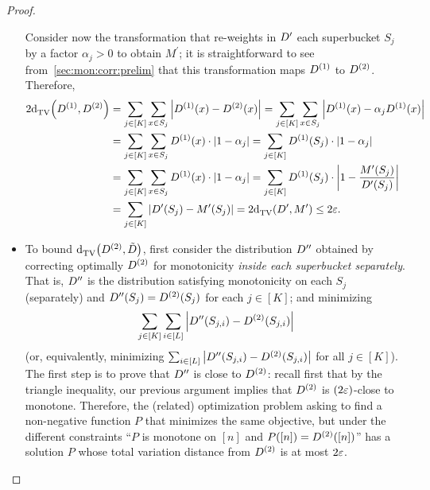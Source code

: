 \begin{proof}
\begin{itemize}
Consider now the transformation that re-weights in $D^\prime$ each superbucket $S_j$ by a factor $\alpha_j > 0$ to obtain $M^\prime$; it is straightforward to see from~\autoref{sec:mon:corr:prelim} that this transformation maps $D^{(1)}$ to $D^{(2)}$. Therefore,
\begin{align*}
2{\operatorname{d}_{\textrm{TV}}^{}\!\left({D^{(1)}, D^{(2)}}\right)} &= \sum_{j\in [K]} \sum_{x\in S_j} \left\lvert  D^{(1)}(x) - D^{(2)}(x)  \right\rvert = \sum_{j\in [K]} \sum_{x\in S_j} \left\lvert  D^{(1)}(x) - \alpha_jD^{(1)}(x)  \right\rvert \\
&= \sum_{j\in [K]} \sum_{x\in S_j}  D^{(1)}(x)\cdot \left\lvert  1 - \alpha_j  \right\rvert= \sum_{j\in [K]}  D^{(1)}(S_j)\cdot \left\lvert  1 - \alpha_j  \right\rvert \\
&= \sum_{j\in [K]} \sum_{x\in S_j}  D^{(1)}(x)\cdot \left\lvert  1 - \alpha_j  \right\rvert= \sum_{j\in [K]}  D^{(1)}(S_j)\cdot \left\lvert  1 - \frac{M^\prime(S_j)}{D^\prime(S_j)}  \right\rvert \\
&= \sum_{j\in [K]} \left\lvert  D^\prime(S_j) - M^\prime(S_j) \right\rvert = 2{\operatorname{d}_{\textrm{TV}}^{}\!\left({D^\prime, M^\prime}\right)} \leq 2\varepsilon.
\end{align*}
  \item To bound ${\operatorname{d}_{\textrm{TV}}^{}\!\left({D^{(2)}, \tilde{D}}\right)}$, first consider the distribution $D^{\prime\prime}$  obtained by correcting optimally $D^{(2)}$ for monotonicity \emph{inside each superbucket separately}. That is, $D^{\prime\prime}$ is the distribution satisfying
  monotonicity on each $S_j$ (separately) and $D^{\prime\prime}(S_j) = D^{(2)}(S_j)$ for each $j\in [K]$;
    and minimizing 
    \[
      \sum_{j\in[K]} \sum_{i\in [L]} \left\lvert  D^{\prime\prime}(S_{j,i}) - D^{(2)}(S_{j,i})  \right\rvert 
    \]
  (or, equivalently, minimizing $\sum_{i\in [L]} \left\lvert  D^{\prime\prime}(S_{j,i}) - D^{(2)}(S_{j,i})  \right\rvert$ for all $j\in[K]$). The first step is to prove that $D^{\prime\prime}$ is close to $D^{(2)}$: recall first that by the triangle inequality, our previous argument implies that $D^{(2)}$ is $(2\varepsilon)$-close to monotone. Therefore, the (related) optimization problem asking to find a non-negative function $P$ that minimizes the same objective, but under the different constraints ``$P$ is monotone on $[n]$ and $P([n]) = D^{(2)}([n])$'' has a solution $P$ whose total variation distance from $D^{(2)}$ is at most $2\varepsilon$.
  

\end{itemize}
\end{proof}
